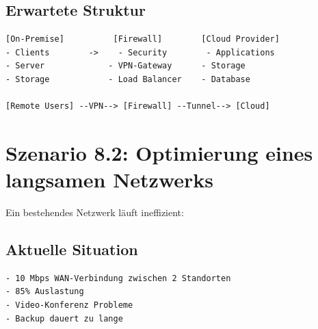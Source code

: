 \documentclass[12pt,a4paper,german]{report}
\begin{document}
\subsection{Erwartete Struktur}
\begin{lstlisting}
[On-Premise]          [Firewall]        [Cloud Provider]
- Clients        ->    - Security        - Applications
- Server             - VPN-Gateway      - Storage
- Storage            - Load Balancer    - Database

[Remote Users] --VPN--> [Firewall] --Tunnel--> [Cloud]
\end{lstlisting}

\section{Szenario 8.2: Optimierung eines langsamen Netzwerks}

Ein bestehendes Netzwerk läuft ineffizient:

\subsection{Aktuelle Situation}
\begin{lstlisting}
- 10 Mbps WAN-Verbindung zwischen 2 Standorten
- 85% Auslastung
- Video-Konferenz Probleme
- Backup dauert zu lange
\end{lstlisting}
\end{document}
